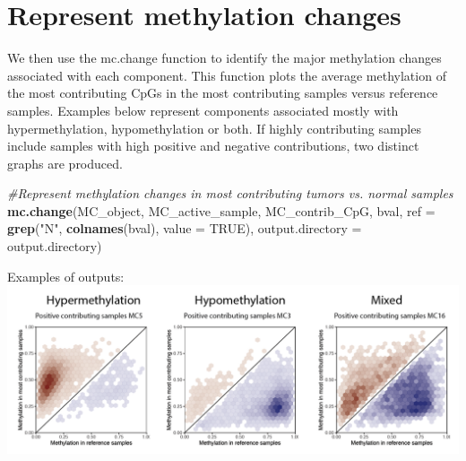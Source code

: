 \documentclass[]{article}
\newenvironment{Shaded}{\begin{snugshade}}{\end{snugshade}}
\newcommand{\KeywordTok}[1]{\textcolor[rgb]{0.13,0.29,0.53}{\textbf{#1}}}
\newcommand{\DataTypeTok}[1]{\textcolor[rgb]{0.13,0.29,0.53}{#1}}
\newcommand{\StringTok}[1]{\textcolor[rgb]{0.31,0.60,0.02}{#1}}
\newcommand{\CommentTok}[1]{\textcolor[rgb]{0.56,0.35,0.01}{\textit{#1}}}
\newcommand{\OtherTok}[1]{\textcolor[rgb]{0.56,0.35,0.01}{#1}}
\newcommand{\NormalTok}[1]{#1}
\begin{document}
\section{Represent methylation
changes}\label{represent-methylation-changes}

We then use the mc.change function to identify the major methylation
changes associated with each component. This function plots the average
methylation of the most contributing CpGs in the most contributing
samples versus reference samples. Examples below represent components
associated mostly with hypermethylation, hypomethylation or both. If
highly contributing samples include samples with high positive and
negative contributions, two distinct graphs are produced.

\begin{Shaded}
\begin{Highlighting}[]
\CommentTok{#Represent methylation changes in most contributing tumors vs. normal samples}
\KeywordTok{mc.change}\NormalTok{(MC_object, MC_active_sample, MC_contrib_CpG, bval, }\DataTypeTok{ref =} \KeywordTok{grep}\NormalTok{(}\StringTok{"N"}\NormalTok{, }\KeywordTok{colnames}\NormalTok{(bval), }\DataTypeTok{value =} \OtherTok{TRUE}\NormalTok{), }\DataTypeTok{output.directory =}\NormalTok{ output.directory)}
\end{Highlighting}
\end{Shaded}

Examples of outputs:
\includegraphics[width=1.00000\textwidth,height=1.00000\textwidth]{./meth_change.png}
\end{document}
